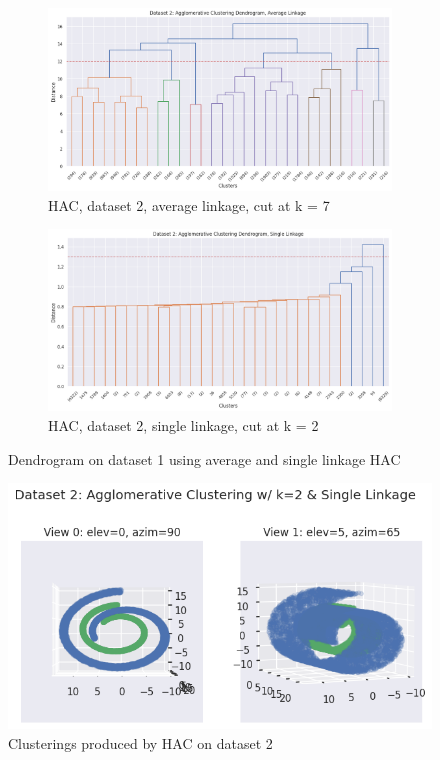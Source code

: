 \documentclass[12pt]{article}
\begin{document}
\begin{figure}[ht]
  \centering
  \begin{subfigure}{0.6\textwidth}
    \centering
    \includegraphics[width=\linewidth]{c.png}
    \caption{HAC, dataset 2, average linkage, cut at k = 7}
    \label{fig:c}
  \end{subfigure}%
  \vspace{1em} %
  \begin{subfigure}{0.6\textwidth}
    \centering
    \includegraphics[width=\linewidth]{d.png}
    \caption{HAC, dataset 2, single linkage, cut at k = 2}
    \label{fig:d}
  \end{subfigure}%
  \caption{Dendrogram on dataset 1 using average and single linkage HAC}
  \label{fig:dend_2}
\end{figure}

\begin{figure}[ht]
  \centering
  \includegraphics[width=0.75\linewidth]{fff.png}
  \caption{Clusterings produced by HAC on dataset 2}
  \label{fig:dist_4}
\end{figure}
\end{document}
